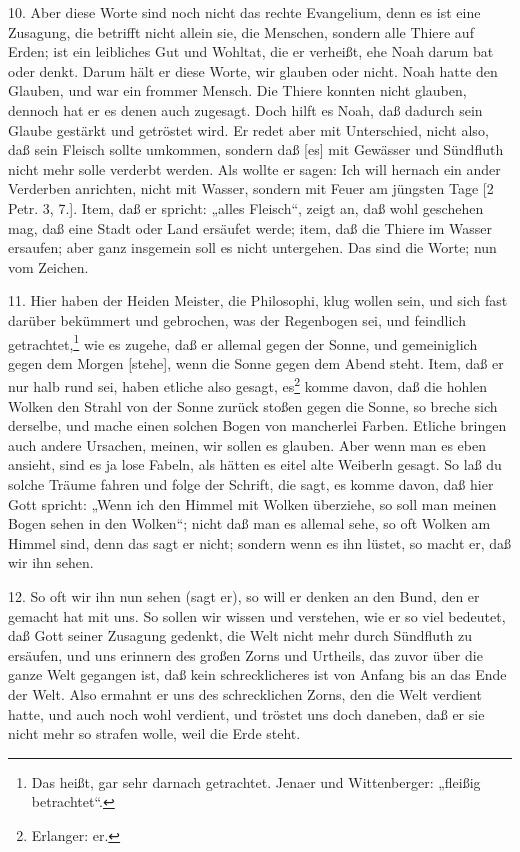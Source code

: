 10. Aber diese Worte sind noch nicht das rechte Evangelium, denn es ist eine Zusagung, die betrifft nicht allein sie, die Menschen, sondern alle Thiere auf Erden; ist ein leibliches Gut und Wohltat, die er verheißt, ehe Noah darum bat oder denkt. Darum hält er diese Worte, wir glauben oder nicht. Noah hatte den Glauben, und war ein frommer Mensch. Die Thiere konnten nicht glauben, dennoch hat er es denen auch zugesagt. Doch hilft es Noah, daß dadurch sein Glaube gestärkt und getröstet wird. Er redet aber mit Unterschied, nicht also, daß sein Fleisch sollte umkommen, sondern daß [es] mit Gewässer und Sündfluth nicht mehr solle verderbt werden. Als wollte er sagen: Ich will hernach ein ander Verderben anrichten, nicht mit Wasser, sondern mit Feuer am jüngsten Tage [2 Petr. 3, 7.]. Item, daß er spricht: „alles Fleisch“, zeigt an, daß wohl geschehen mag, daß eine Stadt oder Land ersäufet werde; item, daß die Thiere im Wasser ersaufen; aber ganz insgemein soll es nicht untergehen. Das sind die Worte; nun vom Zeichen.

11. Hier haben der Heiden Meister, die Philosophi, klug wollen sein, und sich fast darüber bekümmert und gebrochen, was der Regenbogen sei, und feindlich getrachtet,\footnote{Das heißt, gar sehr darnach getrachtet. Jenaer und Wittenberger: „fleißig betrachtet“.} wie es zugehe, daß er allemal gegen der Sonne, und gemeiniglich gegen dem Morgen [stehe], wenn die Sonne gegen dem Abend steht. Item, daß er nur halb rund sei, haben etliche also gesagt, es\footnote{Erlanger: er.} komme davon, daß die hohlen Wolken den Strahl von der Sonne zurück stoßen gegen die Sonne, so breche sich derselbe, und mache einen solchen Bogen von mancherlei Farben. Etliche bringen auch andere Ursachen, meinen, wir sollen es
glauben. Aber wenn man es eben ansieht, sind es ja lose Fabeln, als hätten es eitel alte Weiberln gesagt. So laß du solche Träume fahren und folge der Schrift, die sagt, es komme davon, daß hier Gott spricht: „Wenn ich den Himmel mit Wolken überziehe, so soll man meinen Bogen sehen in den Wolken“; nicht daß man es allemal sehe, so oft Wolken am Himmel sind, denn das sagt er nicht; sondern wenn es ihn lüstet, so macht er, daß wir ihn sehen.

12. So oft wir ihn nun sehen (sagt er), so will er denken an den Bund, den er gemacht hat mit uns. So sollen wir wissen und verstehen, wie er so viel bedeutet, daß Gott seiner Zusagung gedenkt, die Welt nicht mehr durch Sündfluth zu ersäufen, und uns erinnern des großen Zorns und Urtheils, das zuvor über die ganze Welt gegangen ist, daß kein schrecklicheres ist von Anfang bis an das Ende der Welt. Also ermahnt er uns des schrecklichen Zorns, den die Welt verdient hatte, und auch noch wohl verdient, und tröstet uns doch daneben, daß er sie nicht mehr so strafen wolle, weil die Erde steht.

